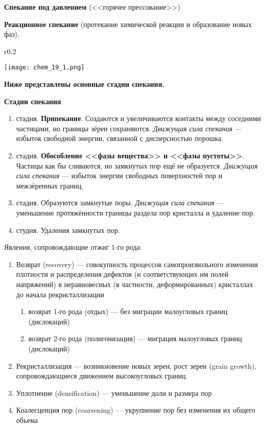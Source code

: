 \textbf{Спекание под давлением} (<<горячее прессование>>)

\textbf{Реакционное спекание} (протекание химической реакции и образование новых фаз).

\begin{wrapfigure}{r}{0.2\textwidth}
    \begin{center}
        \texttt{[image: chem\_19\_1.png]}
    \end{center}
\end{wrapfigure}

\textbf{Ниже представлены основные стадии спекания.}



\textbf{Стадии спекания}


\begin{enumerate}
    \item стадия. \textbf{Припекание}. Создаются и увеличиваются контакты между соседними частицами, но границы зёрен сохраняются. \textit{Движущая сила спекания} --- избыток свободной энергии, связанной с дисперсностью порошка.
    \item стадия. \textbf{Обособление <<фазы вещества>> и <<фазы пустоты>>}. Частицы как бы сливаются, но замкнутых пор ещё не образуется. \textit{Движущая сила спекания} --- избыток энергии свободных поверхностей пор и межзёренных границ.
    \item стадия. Образуются замкнутые поры. \textit{Движущая сила спекания} --- уменьшение протяжённости границы раздела пор кристалла и удаление пор.
    \item студия. Удаления замкнутых пор.
\end{enumerate}


Явления, сопровождающие отжиг 1-го рода:

\begin{enumerate}
    \item Возврат (recovery) --- совокупность процессов самопроизвольного изменения плотности и распределения дефектов (и соответствующих им полей напряжений) в неравновесных (в частности, деформированных) кристаллах до начала рекристаллизации
    \begin{enumerate}
        \item возврат 1-го рода (отдых) --- без миграции малоугловых границ (дислокаций)
        \item возврат 2-го рода (полигонизация) --- миграция малоугловых границ (дислокаций)
    \end{enumerate}
    \item Рекристаллизация --- возникновение новых зерен, рост зерен (grain growth), сопровождающиеся движением высокоугловых границ
    \item Уплотнение (densification) --- уменьшение доли и размера пор
    \item Коалесценция пор (coarsening) --- укрупнение пор без изменения их общего объема
\end{enumerate}

